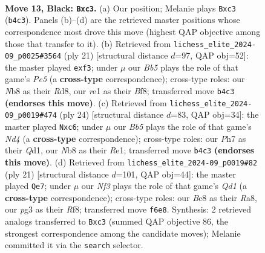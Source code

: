 \documentclass[11pt]{article}
\begin{document}
\clearpage

\begin{figure}[p]\centering
\begin{subfigure}{0.46\textwidth}\centering
\resizebox{\linewidth}{!}{%
\newchessgame
\chessboard[
  setfen={rnb3k1/pp1qr1pp/2p1pn2/5p2/1bPP4/2N1PNP1/P2B1PBP/1R1QR1K1 b - - 4 13},
  showmover=false,
  pgfstyle=straightmove, color=movearrow, markmove={b4-c3}
]}
\caption{}
\end{subfigure}\hfill
\begin{subfigure}{0.46\textwidth}\centering
\resizebox{\linewidth}{!}{%
\newchessgame
\chessboard[
  setfen={1k1r1bnr/pppq2pp/2n2p2/1P3b2/4p3/P1N1PN2/1B1P1PPP/2RQKB1R b K - 0 11},
  showmover=false,
  pgfstyle=straightmove, color=movearrow, markmove={e4-f3}
]}
\caption{}
\end{subfigure}
\\[4pt]
\begin{subfigure}{0.46\textwidth}\centering
\resizebox{\linewidth}{!}{%
\newchessgame
\chessboard[
  setfen={r2qr1k1/pppb1pbp/2np1np1/8/3NPB2/2N3P1/PPP2PBP/R2QR1K1 w - - 6 13},
  showmover=false,
  pgfstyle=straightmove, color=movearrow, markmove={d4-c6}
]}
\caption{}
\end{subfigure}\hfill
\begin{subfigure}{0.46\textwidth}\centering
\resizebox{\linewidth}{!}{%
\newchessgame
\chessboard[
  setfen={r2q1rk1/pp3ppp/2n1pn2/2b5/1pP3b1/3P1NP1/PB1NPPBP/R2Q1RK1 b - - 4 11},
  showmover=false,
  pgfstyle=straightmove, color=movearrow, markmove={d8-e7}
]}
\caption{}
\end{subfigure}
\caption{\textbf{Move 13, Black: \texttt{Bxc3}.} (a) Our position; Melanie plays \texttt{Bxc3} (\texttt{b4c3}). Panels (b)--(d) are the retrieved master positions whose correspondence most drove this move (highest QAP objective among those that transfer to it). (b) Retrieved from \texttt{lichess\_elite\_2024-09\_p0025\#3564} (ply 21) [structural distance $d$=97, QAP obj=52]: the master played \texttt{exf3}; under $\mu$ our \emph{Bb5} plays the role of that game's \emph{Pe5} (a \textbf{cross-type} correspondence); cross-type roles: our \emph{N}b8 as their \emph{R}d8, our \emph{r}e1 as their \emph{B}f8; transferred move \texttt{b4c3} \textbf{(endorses this move)}. (c) Retrieved from \texttt{lichess\_elite\_2024-09\_p0019\#474} (ply 24) [structural distance $d$=83, QAP obj=34]: the master played \texttt{Nxc6}; under $\mu$ our \emph{Bb5} plays the role of that game's \emph{Nd4} (a \textbf{cross-type} correspondence); cross-type roles: our \emph{P}h7 as their \emph{Q}d1, our \emph{N}b8 as their \emph{R}e1; transferred move \texttt{b4c3} \textbf{(endorses this move)}. (d) Retrieved from \texttt{lichess\_elite\_2024-09\_p0019\#82} (ply 21) [structural distance $d$=101, QAP obj=44]: the master played \texttt{Qe7}; under $\mu$ our \emph{Nf3} plays the role of that game's \emph{Qd1} (a \textbf{cross-type} correspondence); cross-type roles: our \emph{B}c8 as their \emph{R}a8, our \emph{p}g3 as their \emph{R}f8; transferred move \texttt{f6e8}. Synthesis: 2 retrieved analogs transferred to \texttt{Bxc3} (summed QAP objective 86, the strongest correspondence among the candidate moves); Melanie committed it via the \texttt{search} selector.}

\end{figure}
\end{document}
